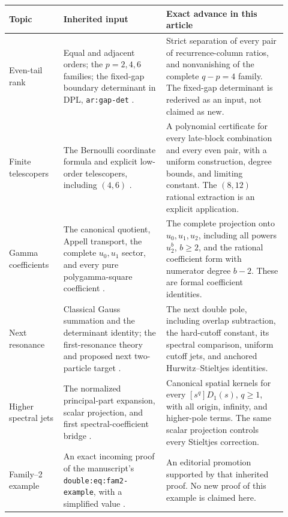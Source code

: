\begin{center}
\small
\begin{tabular}{@{}>{\raggedright\arraybackslash}p{0.18\linewidth}>{\raggedright\arraybackslash}p{0.34\linewidth}>{\raggedright\arraybackslash}p{0.40\linewidth}@{}}
\hline
Topic & Inherited input & Exact advance in this article\\
\hline
Even-tail rank & Equal and adjacent orders; the $p=2,4,6$ families;
the fixed-gap boundary determinant in DPL,
\texttt{ar:gap-det} \cite{DPL,PTI,BTD}.
& Strict separation of every pair of recurrence-column ratios, and
nonvanishing of the complete $q-p=4$ family. The fixed-gap determinant
is rederived as an input, not claimed as new.\\[4pt]
Finite telescopers & The Bernoulli coordinate formula and explicit
low-order telescopers, including $(4,6)$ \cite{DPL}.
& A polynomial certificate for every late-block combination and every
even pair, with a uniform construction, degree bounds, and limiting
constant. The $(8,12)$ rational extraction is an explicit application.\\[4pt]
Gamma coefficients & The canonical quotient, Appell transport, the
complete $u_0,u_1$ sector, and every pure polygamma-square coefficient
\cite{DPL,PTI,BTD}.
& The complete projection onto $u_0,u_1,u_2$, including all powers
$u_2^b$, $b\ge2$, and the rational coefficient form with numerator
degree $b-2$. These are formal coefficient identities.\\[4pt]
Next resonance & Classical Gauss summation and the determinant
identity; the first-resonance theory and proposed next two-particle
target \cite{DHR}.
& The next double pole, including overlap subtraction, the hard-cutoff
constant, its spectral comparison, uniform cutoff jets, and anchored
Hurwitz--Stieltjes identities.\\[4pt]
Higher spectral jets & The normalized principal-part expansion,
scalar projection, and first spectral-coefficient bridge \cite{DPL}.
& Canonical spatial kernels for every $[s^q]D_1(s)$, $q\ge1$, with
all origin, infinity, and higher-pole terms. The same scalar projection
controls every Stieltjes correction.\\[4pt]
Family--2 example & An exact incoming proof of the manuscript's
\texttt{double:eq:fam2-example}, with a simplified value \cite{PTI}.
& An editorial promotion supported by that inherited proof. No new
proof of this example is claimed here.\\
\hline
\end{tabular}
\end{center}

